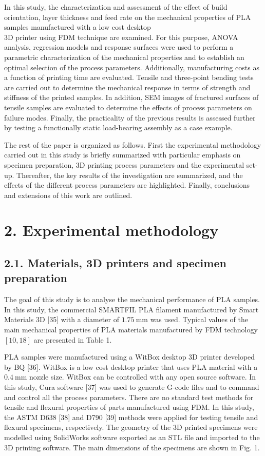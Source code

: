 \documentclass[10pt]{article}
\begin{document}
In this study, the characterization and assessment of the effect of build orientation, layer thickness and feed rate on the mechanical properties of PLA samples manufactured with a low cost desktop\\
3D printer using FDM technique are examined. For this purpose, ANOVA analysis, regression models and response surfaces were used to perform a parametric characterization of the mechanical properties and to establish an optimal selection of the process parameters. Additionally, manufacturing costs as a function of printing time are evaluated. Tensile and three-point bending tests are carried out to determine the mechanical response in terms of strength and stiffness of the printed samples. In addition, SEM images of fractured surfaces of tensile samples are evaluated to determine the effects of process parameters on failure modes. Finally, the practicality of the previous results is assessed further by testing a functionally static load-bearing assembly as a case example.

The rest of the paper is organized as follows. First the experimental methodology carried out in this study is briefly summarized with particular emphasis on specimen preparation, 3D printing process parameters and the experimental set-up. Thereafter, the key results of the investigation are summarized, and the effects of the different process parameters are highlighted. Finally, conclusions and extensions of this work are outlined.

\section*{2. Experimental methodology}
\subsection*{2.1. Materials, 3D printers and specimen preparation}
The goal of this study is to analyse the mechanical performance of PLA samples. In this study, the commercial SMARTFIL PLA filament manufactured by Smart Materials 3D [35] with a diameter of $1.75 \mathrm{~mm}$ was used. Typical values of the main mechanical properties of PLA materials manufactured by FDM technology $[10,18]$ are presented in Table 1.

PLA samples were manufactured using a WitBox desktop 3D printer developed by BQ [36]. WitBox is a low cost desktop printer that uses PLA material with a $0.4 \mathrm{~mm}$ nozzle size. WitBox can be controlled with any open source software. In this study, Cura software [37] was used to generate G-code files and to command and control all the process parameters. There are no standard test methods for tensile and flexural properties of parts manufactured using FDM. In this study, the ASTM D638 [38] and D790 [39] methods were applied for testing tensile and flexural specimens, respectively. The geometry of the 3D printed specimens were modelled using SolidWorks software exported as an STL file and imported to the 3D printing software. The main dimensions of the specimens are shown in Fig. 1.
\end{document}
